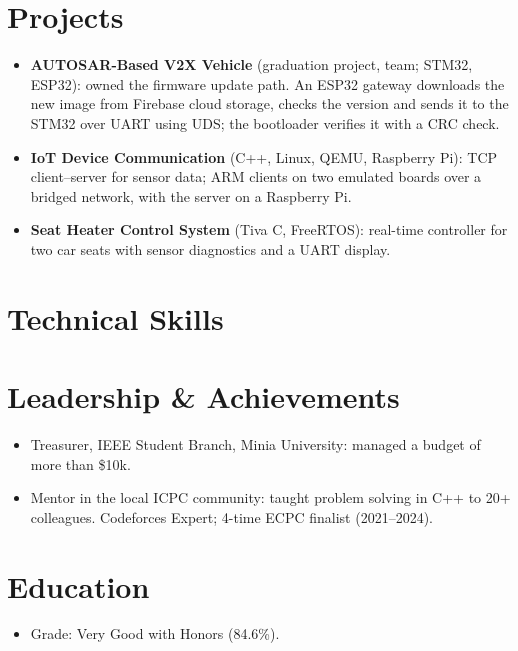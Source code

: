 \documentclass[10pt]{article}
\begin{document}
\section*{Projects}
\begin{itemize}
  \item \textbf{AUTOSAR-Based V2X Vehicle} (graduation project, team; STM32, ESP32): owned the firmware update path. An ESP32 gateway downloads the new image from Firebase cloud storage, checks the version and sends it to the STM32 over UART using UDS; the bootloader verifies it with a CRC check. 
  \item \textbf{IoT Device Communication} (C++, Linux, QEMU, Raspberry Pi): TCP client--server for sensor data; ARM clients on two emulated boards over a bridged network, with the server on a Raspberry Pi. 
  \item \textbf{Seat Heater Control System} (Tiva C, FreeRTOS): real-time controller for two car seats with sensor diagnostics and a UART display. 
\end{itemize}

\section*{Technical Skills}

\section*{Leadership \& Achievements}
\begin{itemize}
  \item Treasurer, IEEE Student Branch, Minia University: managed a budget of more than \$10k.
  \item Mentor in the local ICPC community: taught problem solving in C++ to 20+ colleagues. Codeforces Expert; 4-time ECPC finalist (2021--2024).
\end{itemize}

\section*{Education}
\begin{itemize}
  \item Grade: Very Good with Honors (84.6\%).
\end{itemize}
\end{document}
